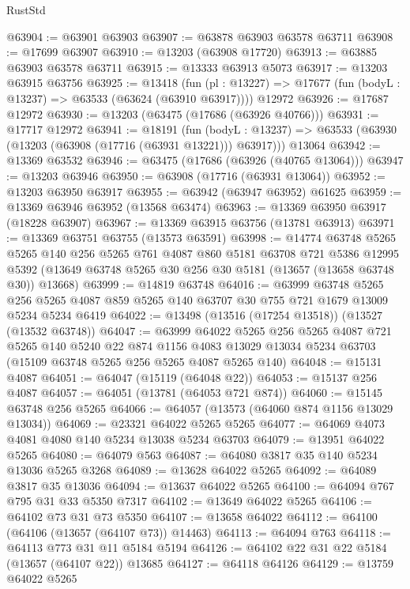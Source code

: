 \begin{lexlean}{RustStd}
\begin{coremodule}
@63904 := @63901 @63903
@63907 := @63878 @63903 @63578 @63711
@63908 := @17699 @63907
@63910 := @13203 (@63908 @17720)
@63913 := @63885 @63903 @63578 @63711
@63915 := @13333 @63913 @5073
@63917 := @13203 @63915 @63756
@63925 := @13418
    (fun (pl : @13227) => @17677 (fun (bodyL : @13237) => @63533 (@63624 (@63910 @63917))))
    @12972
@63926 := @17687 @12972
@63930 := @13203 (@63475 (@17686 (@63926 @40766)))
@63931 := @17717 @12972
@63941 := @18191
    (fun (bodyL : @13237) => @63533 (@63930 (@13203 (@63908 (@17716 (@63931 @13221))) @63917)))
    @13064
@63942 := @13369 @63532
@63946 := @63475 (@17686 (@63926 (@40765 @13064)))
@63947 := @13203 @63946
@63950 := @63908 (@17716 (@63931 @13064))
@63952 := @13203 @63950 @63917
@63955 := @63942 (@63947 @63952) @61625
@63959 := @13369 @63946 @63952 (@13568 @63474)
@63963 := @13369 @63950 @63917 (@18228 @63907)
@63967 := @13369 @63915 @63756 (@13781 @63913)
@63971 := @13369 @63751 @63755 (@13573 @63591)
@63998 := @14774
    @63748
    @5265
    @5265
    @140
    @256
    @5265
    @761
    @4087
    @860
    @5181
    @63708
    @721
    @5386
    @12995
    @5392
    (@13649 @63748 @5265 @30 @256 @30 @5181 (@13657 (@13658 @63748 @30)) @13668)
@63999 := @14819 @63748
@64016 := @63999
    @63748
    @5265
    @256
    @5265
    @4087
    @859
    @5265
    @140
    @63707
    @30
    @755
    @721
    @1679
    @13009
    @5234
    @5234
    @6419
@64022 := @13498 (@13516 (@17254 @13518)) (@13527 (@13532 @63748))
@64047 := @63999
    @64022
    @5265
    @256
    @5265
    @4087
    @721
    @5265
    @140
    @5240
    @22
    @874
    @1156
    @4083
    @13029
    @13034
    @5234
    @63703
    (@15109 @63748 @5265 @256 @5265 @4087 @5265 @140)
@64048 := @15131 @4087
@64051 := @64047 (@15119 (@64048 @22))
@64053 := @15137 @256 @4087
@64057 := @64051 (@13781 (@64053 @721 @874))
@64060 := @15145 @63748 @256 @5265
@64066 := @64057 (@13573 (@64060 @874 @1156 @13029 @13034))
@64069 := @23321 @64022 @5265 @5265
@64077 := @64069 @4073 @4081 @4080 @140 @5234 @13038 @5234 @63703
@64079 := @13951 @64022 @5265
@64080 := @64079 @563
@64087 := @64080 @3817 @35 @140 @5234 @13036 @5265 @3268
@64089 := @13628 @64022 @5265
@64092 := @64089 @3817 @35 @13036
@64094 := @13637 @64022 @5265
@64100 := @64094 @767 @795 @31 @33 @5350 @7317
@64102 := @13649 @64022 @5265
@64106 := @64102 @73 @31 @73 @5350
@64107 := @13658 @64022
@64112 := @64100 (@64106 (@13657 (@64107 @73)) @14463)
@64113 := @64094 @763
@64118 := @64113 @773 @31 @11 @5184 @5194
@64126 := @64102 @22 @31 @22 @5184 (@13657 (@64107 @22)) @13685
@64127 := @64118 @64126
@64129 := @13759 @64022 @5265

\end{coremodule}
\end{lexlean}
